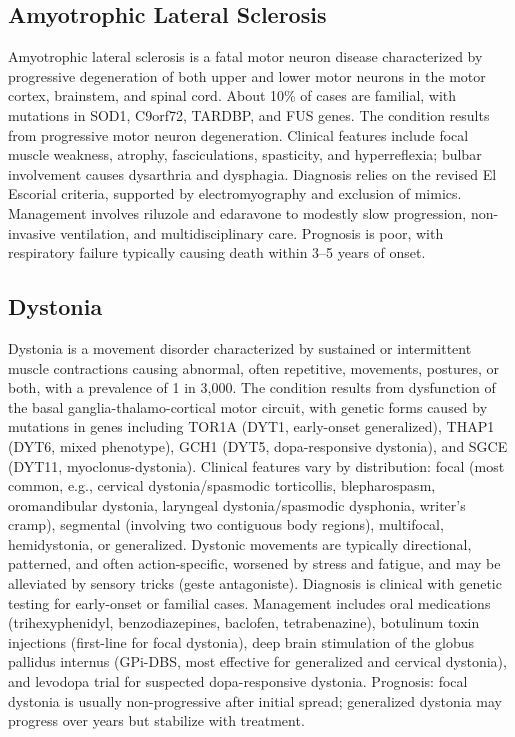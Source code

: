 \subsection{Amyotrophic Lateral Sclerosis}
\label{sec:Amyotrophic Lateral Sclerosis}
Amyotrophic lateral sclerosis is a fatal motor neuron disease characterized by progressive degeneration of both upper and lower motor neurons in the motor cortex, brainstem, and spinal cord. About 10\% of cases are familial, with mutations in SOD1, C9orf72, TARDBP, and FUS genes. The condition results from progressive motor neuron degeneration. Clinical features include focal muscle weakness, atrophy, fasciculations, spasticity, and hyperreflexia; bulbar involvement causes dysarthria and dysphagia. Diagnosis relies on the revised El Escorial criteria, supported by electromyography and exclusion of mimics. Management involves riluzole and edaravone to modestly slow progression, non-invasive ventilation, and multidisciplinary care. Prognosis is poor, with respiratory failure typically causing death within 3--5 years of onset.

\subsection{Dystonia}
\label{sec:Dystonia}
Dystonia is a movement disorder characterized by sustained or intermittent muscle contractions causing abnormal, often repetitive, movements, postures, or both, with a prevalence of 1 in 3,000. The condition results from dysfunction of the basal ganglia-thalamo-cortical motor circuit, with genetic forms caused by mutations in genes including TOR1A (DYT1, early-onset generalized), THAP1 (DYT6, mixed phenotype), GCH1 (DYT5, dopa-responsive dystonia), and SGCE (DYT11, myoclonus-dystonia). Clinical features vary by distribution: focal (most common, e.g., cervical dystonia/spasmodic torticollis, blepharospasm, oromandibular dystonia, laryngeal dystonia/spasmodic dysphonia, writer's cramp), segmental (involving two contiguous body regions), multifocal, hemidystonia, or generalized. Dystonic movements are typically directional, patterned, and often action-specific, worsened by stress and fatigue, and may be alleviated by sensory tricks (geste antagoniste). Diagnosis is clinical with genetic testing for early-onset or familial cases. Management includes oral medications (trihexyphenidyl, benzodiazepines, baclofen, tetrabenazine), botulinum toxin injections (first-line for focal dystonia), deep brain stimulation of the globus pallidus internus (GPi-DBS, most effective for generalized and cervical dystonia), and levodopa trial for suspected dopa-responsive dystonia. Prognosis: focal dystonia is usually non-progressive after initial spread; generalized dystonia may progress over years but stabilize with treatment.

